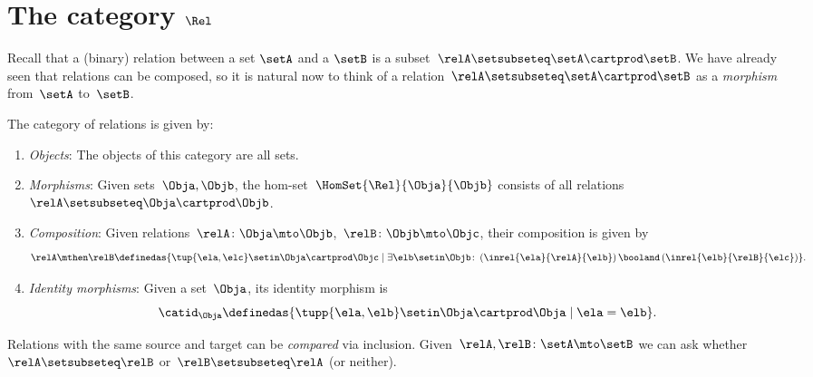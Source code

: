 
\section[The category $\Rel$]{The category $\Rel$}
\label{sec:cat-of-relations}



Recall that a (binary) relation between a set $\setA$ and a $\setB$ is a subset~$\relA \setsubseteq \setA \cartprod \setB$.
We have already seen that relations can be composed, so it is natural now to think of a relation~$\relA \setsubseteq \setA \cartprod \setB$ as a \emph{morphism} from~$\setA$ to~$\setB$.

\begin{ctdefinition}
    \label{def:Rel}
    The category of relations \iindex{\Rel}  is given by:
    \begin{enumerate}
        \item \emph{Objects}: The objects of this category are all sets.
        \item \emph{Morphisms}: Given sets~$\Obja, \Objb$, the hom-set~$\HomSet{\Rel}{\Obja}{\Objb}$ consists of all relations~$\relA\setsubseteq \Obja\cartprod \Objb$.
        \item \emph{Composition}: Given relations~$\relA \colon \Obja\mto \Objb$,~$\relB \colon \Objb\mto \Objc$, their composition is given by
              \begin{equation}
                  \label{eq:RelCompRule}
                  \relA \mthen \relB \definedas \{\tup{\ela,\elc} \setin \Obja \cartprod \Objc \mid  \exists \elb \setin \Objb \colon \left(\inrel{\ela}{\relA}{\elb} \right) \booland \left(\inrel{\elb}{\relB}{\elc}\right)\}.
              \end{equation}
        \item \emph{Identity morphisms}: Given a set~$\Obja$, its identity morphism is
              \begin{equation*}
                  \catid_\Obja \definedas \{ \tupp{\ela,\elb} \setin \Obja \cartprod \Obja \mid  \ela = \elb \}.
              \end{equation*}
    \end{enumerate}
\end{ctdefinition}

\begin{remark}
    Relations with the same source and target can be \emph{compared} via inclusion.
    Given~$\relA, \relB \colon \setA\mto \setB$  we can ask whether~$\relA\setsubseteq \relB$ or~$\relB\setsubseteq \relA$ (or neither).
\end{remark}

